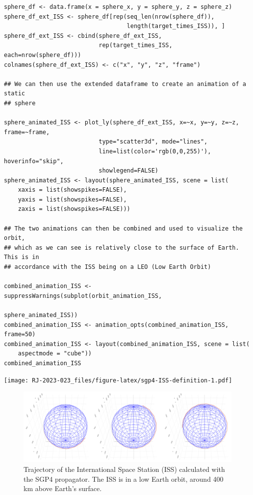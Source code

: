 \begin{verbatim}
sphere_df <- data.frame(x = sphere_x, y = sphere_y, z = sphere_z)
sphere_df_ext_ISS <- sphere_df[rep(seq_len(nrow(sphere_df)), 
                                   length(target_times_ISS)), ]
sphere_df_ext_ISS <- cbind(sphere_df_ext_ISS, 
                           rep(target_times_ISS, each=nrow(sphere_df)))
colnames(sphere_df_ext_ISS) <- c("x", "y", "z", "frame")

## We can then use the extended dataframe to create an animation of a static
## sphere

sphere_animated_ISS <- plot_ly(sphere_df_ext_ISS, x=~x, y=~y, z=~z, frame=~frame, 
                           type="scatter3d", mode="lines", 
                           line=list(color='rgb(0,0,255)'), hoverinfo="skip",
                           showlegend=FALSE)
sphere_animated_ISS <- layout(sphere_animated_ISS, scene = list(
    xaxis = list(showspikes=FALSE), 
    yaxis = list(showspikes=FALSE),
    zaxis = list(showspikes=FALSE)))

## The two animations can then be combined and used to visualize the orbit,
## which as we can see is relatively close to the surface of Earth. This is in
## accordance with the ISS being on a LEO (Low Earth Orbit)

combined_animation_ISS <- suppressWarnings(subplot(orbit_animation_ISS, 
                                                   sphere_animated_ISS))
combined_animation_ISS <- animation_opts(combined_animation_ISS, frame=50)
combined_animation_ISS <- layout(combined_animation_ISS, scene = list(
    aspectmode = "cube"))
combined_animation_ISS
\end{verbatim}

\texttt{[image: RJ-2023-023\_files/figure-latex/sgp4-ISS-definition-1.pdf]}

\begin{figure}[H]

{\centering \includegraphics[width=0.99\linewidth]{static/ISS_static} 

}

\caption{Trajectory of the International Space Station (ISS) calculated with the SGP4 propagator. The ISS is in a low Earth orbit, around 400 km above Earth's surface.}\label{fig:sgp4-ISS-figure-static}
\end{figure}

